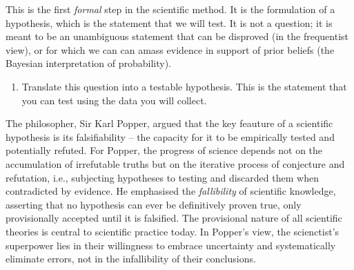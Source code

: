 \documentclass[
  letterpaper,
]{book}
\providecommand{\tightlist}{%
  \setlength{\itemsep}{0pt}\setlength{\parskip}{0pt}}\usepackage{longtable,booktabs,array}
\begin{document}
This is the first \emph{formal} step in the scientific method. It is the
formulation of a hypothesis, which is the statement that we will test.
It is not a question; it is meant to be an unambiguous statement that
can be disproved (in the frequentist view), or for which we can can
amass evidence in support of prior beliefs (the Bayesian interpretation
of probability).

\begin{enumerate}
\def\labelenumi{\arabic{enumi}.}
\setcounter{enumi}{2}
\tightlist
\item
  Translate this question into a testable hypothesis. This is the
  statement that you can test using the data you will collect.
\end{enumerate}

The philosopher, Sir Karl Popper, argued that the key feauture of a
scientific hypothesis is its falsifiability -- the capacity for it to be
empirically tested and potentially refuted. For Popper, the progress of
science depends not on the accumulation of irrefutable truths but on the
iterative process of conjecture and refutation, i.e., subjecting
hypotheses to testing and discarded them when contradicted by evidence.
He emphasised the \emph{fallibility} of scientific knowledge, asserting
that no hypothesis can ever be definitively proven true, only
provisionally accepted until it is falsified. The provisional nature of
all scientific theories is central to scientific practice today. In
Popper's view, the scienctist's superpower lies in their willingness to
embrace uncertainty and systematically eliminate errors, not in the
infallibility of their conclusions.
\end{document}
